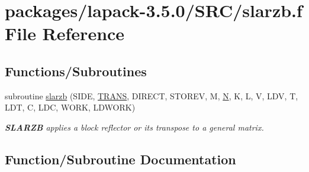 \hypertarget{slarzb_8f}{}\section{packages/lapack-\/3.5.0/\+S\+R\+C/slarzb.f File Reference}
\label{slarzb_8f}
\subsection*{Functions/\+Subroutines}
\begin{DoxyCompactItemize}
\item 
subroutine \hyperlink{slarzb_8f_a72818b8c5558c4ffefa30b57086d500a}{slarzb} (S\+I\+D\+E, \hyperlink{superlu__enum__consts_8h_a0c4e17b2d5cea33f9991ccc6a6678d62a1f61e3015bfe0f0c2c3fda4c5a0cdf58}{T\+R\+A\+N\+S}, D\+I\+R\+E\+C\+T, S\+T\+O\+R\+E\+V, M, \hyperlink{polmisc_8c_a0240ac851181b84ac374872dc5434ee4}{N}, K, L, V, L\+D\+V, T, L\+D\+T, C, L\+D\+C, W\+O\+R\+K, L\+D\+W\+O\+R\+K)
\begin{DoxyCompactList}\small\item\em {\bfseries S\+L\+A\+R\+Z\+B} applies a block reflector or its transpose to a general matrix. \end{DoxyCompactList}\end{DoxyCompactItemize}


\subsection{Function/\+Subroutine Documentation}
\hypertarget{slarzb_8f_a72818b8c5558c4ffefa30b57086d500a}{}
